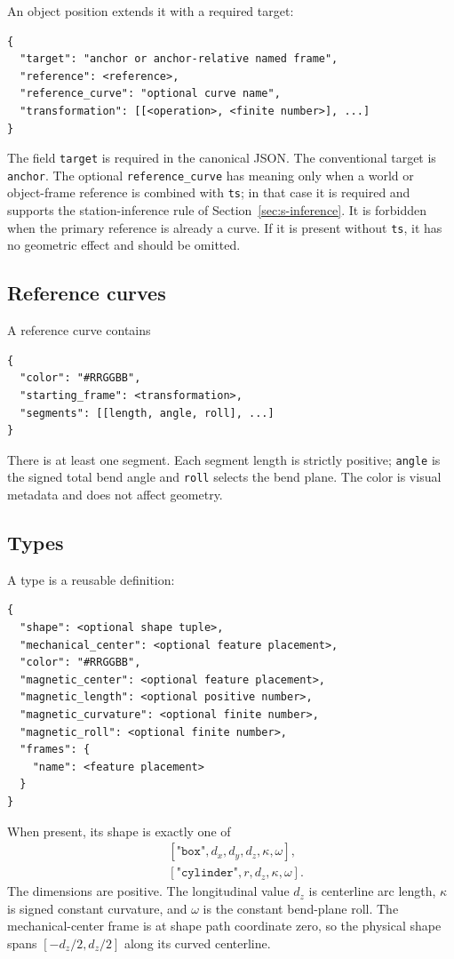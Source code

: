\documentclass[11pt,a4paper]{article}
\begin{document}
An object position extends it with a required target:
\begin{lstlisting}
{
  "target": "anchor or anchor-relative named frame",
  "reference": <reference>,
  "reference_curve": "optional curve name",
  "transformation": [[<operation>, <finite number>], ...]
}
\end{lstlisting}
The field \texttt{target} is required in the canonical JSON.  The conventional
target is \texttt{anchor}.  The optional \texttt{reference\_curve} has meaning
only when a world or object-frame reference is combined with \texttt{ts}; in
that case it is required and supports the station-inference rule of
Section~\ref{sec:s-inference}.  It is forbidden when the primary reference is
already a curve.  If it is present without \texttt{ts}, it has no geometric
effect and should be omitted.

\subsection{Reference curves}

A reference curve contains
\begin{lstlisting}
{
  "color": "#RRGGBB",
  "starting_frame": <transformation>,
  "segments": [[length, angle, roll], ...]
}
\end{lstlisting}
There is at least one segment.  Each segment length is strictly positive;
\texttt{angle} is the signed total bend angle and \texttt{roll} selects the bend
plane.  The color is visual metadata and does not affect geometry.

\subsection{Types}

A type is a reusable definition:
\begin{lstlisting}
{
  "shape": <optional shape tuple>,
  "mechanical_center": <optional feature placement>,
  "color": "#RRGGBB",
  "magnetic_center": <optional feature placement>,
  "magnetic_length": <optional positive number>,
  "magnetic_curvature": <optional finite number>,
  "magnetic_roll": <optional finite number>,
  "frames": {
    "name": <feature placement>
  }
}
\end{lstlisting}
When present, its shape is exactly one of
\begin{align*}
  &[\texttt{"box"},d_x,d_y,d_z,\kappa,\omega],\\
  &[\texttt{"cylinder"},r,d_z,\kappa,\omega].
\end{align*}
The dimensions are positive.  The longitudinal value $d_z$ is centerline arc
length, $\kappa$ is signed constant curvature, and $\omega$ is the constant
bend-plane roll. The mechanical-center frame is at shape path coordinate zero, so
the physical shape spans $[-d_z/2,d_z/2]$ along its curved centerline.
\end{document}
